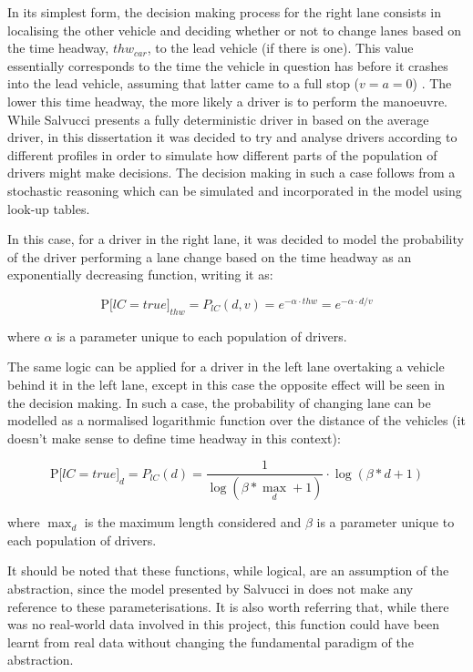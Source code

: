 In its simplest form, the decision making process for the right lane consists in localising the other vehicle and deciding whether or not to change lanes based on the time headway, $thw_{car}$, to the lead vehicle (if there is one). This value essentially corresponds to the time the vehicle in question has before it crashes into the lead vehicle, assuming that latter came to a full stop ($v = a = 0$) \cite{thw}. The lower this time headway, the more likely a driver is to perform the manoeuvre. While Salvucci presents a fully deterministic driver in \cite{salvucci_1} based on the average driver, in this dissertation it was decided to try and analyse drivers according to different profiles in order to simulate how different parts of the population of drivers might make decisions. The decision making in such a case follows from a stochastic reasoning which can be simulated and incorporated in the model using look-up tables. 

In this case, for a driver in the right lane, it was decided to model the probability of the driver performing a lane change based on the time headway as an exponentially decreasing function, writing it as:

\begin{equation}
	\text{P[}lC = true\text{]}_{thw} = P_{lC}(d,v) = e^{-\alpha\cdot thw} = e^{-\alpha\cdot d/v}
\end{equation}

where $\alpha$ is a parameter unique to each population of drivers. 

The same logic can be applied for a driver in the left lane overtaking a vehicle behind it in the left lane, except in this case the opposite effect will be seen in the decision making. In such a case, the probability of changing lane can be modelled as a normalised logarithmic function over the distance of the vehicles (it doesn't make sense to define time headway in this context):

\begin{equation}
	\text{P[}lC = true\text{]}_{d} = P_{lC}(d) = \frac{1}{\log(\beta*\max_d + 1)}\cdot \log(\beta*d + 1)
\end{equation}

where $\max_d$ is the maximum length considered and $\beta$ is a parameter unique to each population of drivers.

It should be noted that these functions, while logical, are an assumption of the abstraction, since the model presented by Salvucci in \cite{salvucci_1} does not make any reference to these parameterisations. It is also worth referring that, while there was no real-world data involved in this project, this function could have been learnt from real data without changing the fundamental paradigm of the abstraction.

